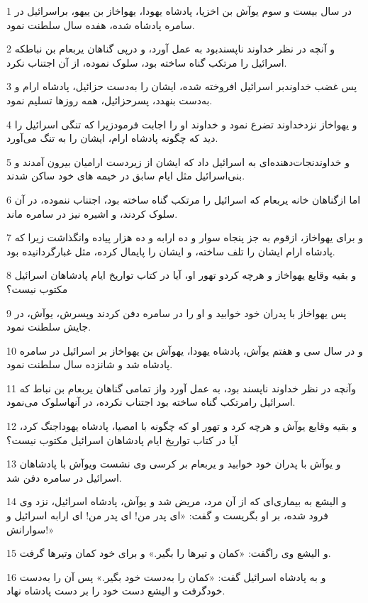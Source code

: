 \par 1 در سال بیست و سوم یوآش بن اخزیا، پادشاه یهودا، یهواخاز بن ییهو، براسرائیل در سامره پادشاه شده، هفده سال سلطنت نمود.
\par 2 و آنچه در نظر خداوند ناپسندبود به عمل آورد، و در‌پی گناهان یربعام بن نباطکه اسرائیل را مرتکب گناه ساخته بود، سلوک نموده، از آن اجتناب نکرد.
\par 3 پس غضب خداوندبر اسرائیل افروخته شده، ایشان را به‌دست حزائیل، پادشاه ارام و به‌دست بنهدد، پسرحزائیل، همه روزها تسلیم نمود.
\par 4 و یهواخاز نزدخداوند تضرع نمود و خداوند او را اجابت فرمودزیرا که تنگی اسرائیل را دید که چگونه پادشاه ارام، ایشان را به تنگ می‌آورد.
\par 5 و خداوندنجات‌دهنده‌ای به اسرائیل داد که ایشان از زیردست ارامیان بیرون آمدند و بنی‌اسرائیل مثل ایام سابق در خیمه های خود ساکن شدند.
\par 6 اما ازگناهان خانه یربعام که اسرائیل را مرتکب گناه ساخته بود، اجتناب ننموده، در آن سلوک کردند، و اشیره نیز در سامره ماند.
\par 7 و برای یهواخاز، ازقوم به جز پنجاه سوار و ده ارابه و ده هزار پیاده وانگذاشت زیرا که پادشاه ارام ایشان را تلف ساخته، و ایشان را پایمال کرده، مثل غبارگردانیده بود.
\par 8 و بقیه وقایع یهواخاز و هر‌چه کردو تهور او، آیا در کتاب تواریخ ایام پادشاهان اسرائیل مکتوب نیست؟
\par 9 پس یهواخاز با پدران خود خوابید و او را در سامره دفن کردند وپسرش، یوآش، در جایش سلطنت نمود.
\par 10 و در سال سی و هفتم یوآش، پادشاه یهودا، یهوآش بن یهواخاز بر اسرائیل در سامره پادشاه شد و شانزده سال سلطنت نمود.
\par 11 وآنچه در نظر خداوند ناپسند بود، به عمل آورد واز تمامی گناهان یربعام بن نباط که اسرائیل رامرتکب گناه ساخته بود اجتناب نکرده، در آنهاسلوک می‌نمود.
\par 12 و بقیه وقایع یوآش و هر‌چه کرد و تهور او که چگونه با امصیا، پادشاه یهوداجنگ کرد، آیا در کتاب تواریخ ایام پادشاهان اسرائیل مکتوب نیست؟
\par 13 و یوآش با پدران خود خوابید و یربعام بر کرسی وی نشست ویوآش با پادشاهان اسرائیل در سامره دفن شد.
\par 14 و الیشع به بیماری‌ای که از آن مرد، مریض شد و یوآش، پادشاه اسرائیل، نزد وی فرود شده، بر او بگریست و گفت: «ای پدر من! ای پدر من! ای ارابه اسرائیل و سوارانش!» 
\par 15 و الیشع وی راگفت: «کمان و تیرها را بگیر.» و برای خود کمان وتیرها گرفت.
\par 16 و به پادشاه اسرائیل گفت: «کمان را به‌دست خود بگیر.» پس آن را به‌دست خودگرفت و الیشع دست خود را بر دست پادشاه نهاد.

